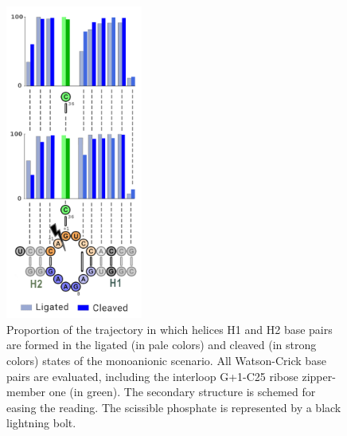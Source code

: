 \documentclass[journal=jacsat,manuscript=article]{achemso}
\begin{document}
\begin{suppinfo}
\begin{figure}[h!]
    \centering
    \includegraphics[width=0.4\textwidth]{figures_SI/pairs.png}
    \caption[Base Pairing in Ligated and Cleaved States for the Monoanionic Scenario]
    {Proportion of the trajectory in which helices H1 and H2 base pairs 
    are formed in the ligated (in pale colors) and cleaved (in strong colors) states of the monoanionic scenario. 
    All Watson-Crick base pairs are evaluated, including the interloop G+1-C25 ribose zipper-member one (in green). 
    The secondary structure is schemed for easing the reading. 
    The scissible phosphate is represented by a black lightning bolt.}
    \label{fig:ccH_prod_basepair}
\end{figure}


\end{suppinfo}
\end{document}
